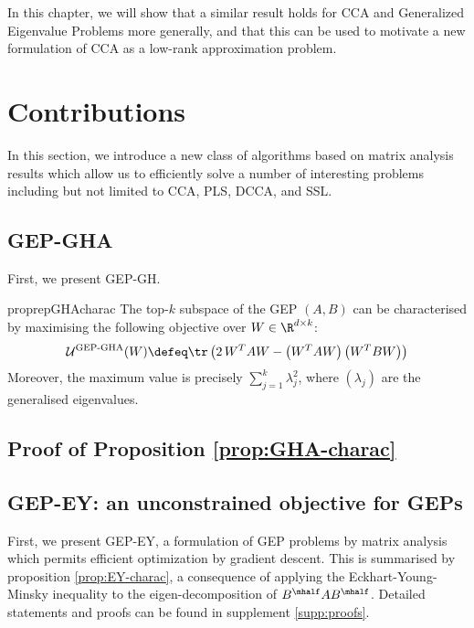 In this chapter, we will show that a similar result holds for CCA and Generalized Eigenvalue Problems more generally, and that this can be used to motivate a new formulation of CCA as a low-rank approximation problem.


\section{Contributions}

In this section, we introduce a new class of algorithms based on matrix analysis results which allow us to efficiently solve a number of interesting problems including but not limited to CCA, PLS, DCCA, and SSL.

\subsection{GEP-GHA}
First, we present GEP-GH.

\begin{restatable}{proprep}{GHAcharac}
    \label{prop:GHA-charac}
    The top-$k$ subspace of the GEP $(A,B)$ can be characterised by maximising the following objective over $W \in \R^{d \times k}$:
    \begin{align}
        \mathcal{U}^\text{GEP-GHA}(W) \defeq \tr \left( 2\, W^T A W - \left(W^T A W\right) \left(W^T B W\right) \right)
    \end{align}
    Moreover, the maximum value is precisely $\sum_{j=1}^k \lambda_j^2$, where $(\lambda_j)$ are the generalised eigenvalues.
\end{restatable}

\subsection{Proof of Proposition \ref{prop:GHA-charac}}

\subsection{GEP-EY: an unconstrained objective for GEPs}

First, we present GEP-EY, a formulation of GEP problems by matrix analysis which permits efficient optimization by gradient descent.
This is summarised by proposition \ref{prop:EY-charac}, a consequence of applying the Eckhart-Young-Minsky inequality \citep{stewart_matrix_1990} to the eigen-decomposition of $B^\mhalf A B^\mhalf$. Detailed statements and proofs can be found in supplement \ref{supp:proofs}.

